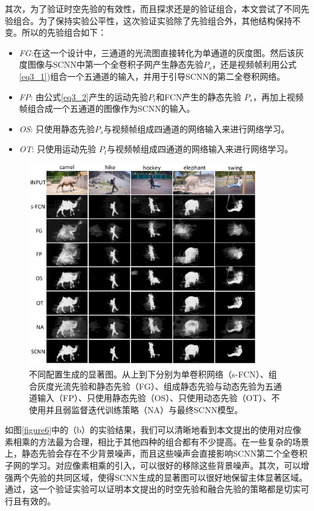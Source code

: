 其次，为了验证时空先验的有效性，而且探求还是的验证组合，本文尝试了不同先验组合。为了保持实验公平性，这次验证实验除了先验组合外，其他结构保持不变。所以的先验组合如下：
\begin{itemize}
\item \textit{FG}:在这一个设计中，三通道的光流图直接转化为单通道的灰度图。然后该灰度图像与SCNN中第一个全卷积子网产生静态先验$P_s$，还是视频帧利用公式 \ref{eq3_1})组合一个五通道的输入，并用于引导SCNN的第二全卷积网络。
\item \textit{FP}: 由公式\ref{eq3_2}产生的运动先验$P_t$和FCN产生的静态先验 $P_s$，再加上视频帧组合成一个五通道的图像作为SCNN的输入。
\item \textit{OS}: 只使用静态先验$P_s$与视频帧组成四通道的网络输入来进行网络学习。
\item \textit{OT}: 只使用运动先验 $P_t$与视频帧组成四通道的网络输入来进行网络学习。
\end{itemize}

\begin{figure}[tbp]
\center
\includegraphics[width=10cm]{figures/show2}
\caption{不同配置生成的显著图。从上到下分别为单卷积网络（s-FCN）、组合灰度光流先验和静态先验（FG）、组成静态先验与动态先验为五通道输入（FP）、只使用静态先验（OS）、只使用动态先验（OT）、不使用并且弱监督迭代训练策略（NA）与最终SCNN模型。}
\label{figure10}
\end{figure}

如图\ref{figure6}中的（b）的实验结果，我们可以清晰地看到本文提出的使用对应像素相乘的方法最为合理，相比于其他四种的组合都有不少提高。在一些复杂的场景上，静态先验会存在不少背景噪声，而且这些噪声会直接影响SCNN第二个全卷积子网的学习。对应像素相乘的引入，可以很好的移除这些背景噪声。其次，可以增强两个先验的共同区域，使得SCNN生成的显著图可以很好地保留主体显著区域。通过，这一个验证实验可以证明本文提出的时空先验和融合先验的策略都是切实可行且有效的。

